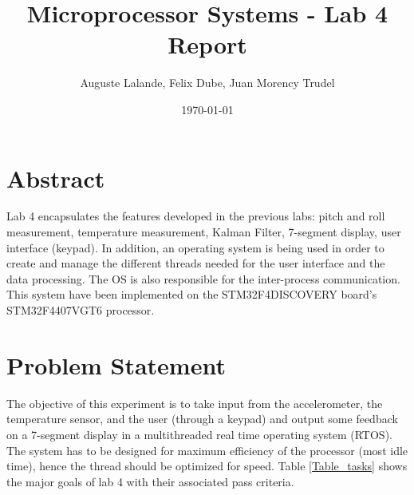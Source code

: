 \documentclass[12pt]{article}
\title{Microprocessor Systems - Lab 4 Report}
\author{Auguste Lalande, Felix Dube, Juan Morency Trudel}
\date{\today}
\begin{document}
\maketitle
\clearpage

\tableofcontents
\clearpage

\section{Abstract}
Lab 4 encapsulates the features developed in the previous labs: pitch and roll measurement, temperature measurement, Kalman Filter, 7-segment display, user interface (keypad). In addition, an operating system is being used in order to create and manage the different threads needed for the user interface and the data processing. The OS is also responsible for the inter-process communication. This system have been implemented on the STM32F4DISCOVERY board’s STM32F4407VGT6 processor.

\section{Problem Statement}
The objective of this experiment is to take input from the accelerometer, the temperature sensor, and the user (through a keypad) and output some feedback on a 7-segment display in a multithreaded real time operating system (RTOS). The system has to be designed for maximum efficiency of the processor (most idle time), hence the thread should be optimized for speed. Table \ref{Table_tasks} shows the major goals of lab 4 with their associated pass criteria.
\end{document}
